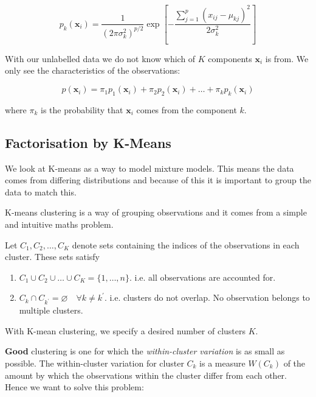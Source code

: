 \documentclass[11pt]{article}
\begin{document}
\begin{equation}
    p_k(\mathbf{x}_i) = \dfrac{1}{(2\pi\sigma_k^2)^{p/2}}\exp\left[-\dfrac{\sum_{j=1}^p (x_{ij}-\mu_{kj})^2}{2\sigma_k^2}\right]
\end{equation}

With our unlabelled data we do not know which of $K$ components $\mathbf{x}_i$ is from. We only see the characteristics of the observations:

\begin{equation*}
    p(\mathbf{x}_i) = \pi_1 p_1(\mathbf{x}_i) + \pi_2 p_2 (\mathbf{x}_i) + \ldots + \pi_k p_k (\mathbf{x}_i)
\end{equation*}

where $\pi_k$ is the probability that $\mathbf{x}_i$ comes from the component $k$.

\subsection{Factorisation by K-Means}

We look at K-means as a way to model mixture models. This means the data comes from differing distributions and because of this it is important to group the data to match this.

K-means clustering is a way of grouping observations and it comes from a simple and intuitive maths problem.

\begin{definition}
    Let $C_1, C_2, \ldots, C_K$ denote sets containing the indices of the observations in each cluster. These sets satisfy

    \begin{enumerate}
        \item $C_1 \cup C_2 \cup \ldots \cup C_K = \{1, \ldots, n\}$. i.e. all observations are accounted for.

        \item $C_k \cap C_{k^\prime} = \varnothing \quad \forall k \neq k^\prime$. i.e. clusters do not overlap. No observation belongs to multiple clusters.
    \end{enumerate}
\end{definition}

\begin{note}
    With K-mean clustering, we specify a desired number of clusters $K$. 
\end{note}

\textbf{Good} clustering is one for which the \textit{within-cluster variation} is as small as possible. The within-cluster variation for cluster $C_k$ is a measure $W(C_k)$ of the amount by which the observations within the cluster differ from each other. Hence we want to solve this problem:
\end{document}
